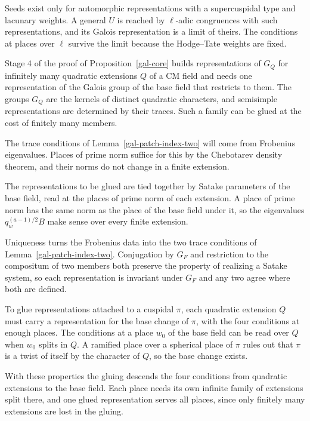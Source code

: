Seeds exist only for automorphic representations with a supercuspidal type and lacunary weights. A
general $U$ is reached by $\ell$-adic congruences with such representations, and its Galois
representation is a limit of theirs. The conditions at places over $\ell$ survive the limit because
the Hodge--Tate weights are fixed.

Stage 4 of the proof of Proposition~\ref{gal-core} builds representations of $G_Q$ for infinitely many
quadratic extensions $Q$ of a CM field and needs one representation of the Galois group of the base
field that restricts to them. The groups $G_Q$ are the kernels of distinct quadratic characters, and
semisimple representations are determined by their traces. Such a family can be glued at the cost of
finitely many members.

The trace conditions of Lemma~\ref{gal-patch-index-two} will come from Frobenius eigenvalues. Places of
prime norm suffice for this by the Chebotarev density theorem, and their norms do not change in a
finite extension.

The representations to be glued are tied together by Satake parameters of the base field, read at the
places of prime norm of each extension. A place of prime norm has the same norm as the place of the base
field under it, so the eigenvalues $q_w^{(a-1)/2}B$ make sense over every finite extension.

Uniqueness turns the Frobenius data into the two trace conditions of Lemma~\ref{gal-patch-index-two}.
Conjugation by $G_F$ and restriction to the compositum of two members both preserve the property of
realizing a Satake system, so each representation is invariant under $G_F$ and any two agree where both
are defined.

To glue representations attached to a cuspidal $\pi$, each quadratic extension $Q$ must carry a
representation for the base change of $\pi$, with the four conditions at enough places. The conditions
at a place $w_0$ of the base field can be read over $Q$ when $w_0$ splits in $Q$. A ramified place over
a spherical place of $\pi$ rules out that $\pi$ is a twist of itself by the character of $Q$, so the
base change exists.

With these properties the gluing descends the four conditions from quadratic extensions to the base
field. Each place needs its own infinite family of extensions split there, and one glued representation
serves all places, since only finitely many extensions are lost in the gluing.

